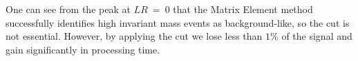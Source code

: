 \documentclass{cmspaper}
\begin{document}
One can see from the peak at $LR~=~0$ that the Matrix Element method successfully identifies high invariant mass events as background-like,
so the cut is not essential. However, by applying the cut we lose less than $1\%$ of the signal and gain significantly in processing time.

\begin{figure}[!hbtp]                                                                                         
\centering                                                                                                    
\end{figure}
\end{document}
